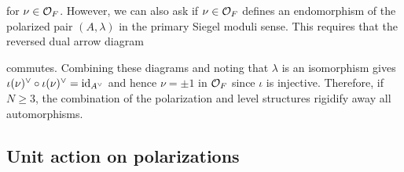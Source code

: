 \documentclass[main.tex]{subfiles}
\begin{document}
\begin{rmk}
\begin{center}
\end{center}
for $\nu \in \mathcal{O}_F$. However, we can also ask if $\nu \in \mathcal{O}_F$ defines an endomorphism of the polarized pair $(A, \lambda)$ in the primary Siegel moduli sense. This requires that the reversed dual arrow diagram 
\begin{center}
\end{center}
commutes. Combining these diagrams and noting that $\lambda$ is an isomorphism gives $\iota(\nu)^{\vee} \circ \iota(\nu)^{\vee} = \mathrm{id}_{A^{\vee}}$ and hence $\nu = \pm 1$ in $\mathcal{O}_F$ since $\iota$ is injective. Therefore, if $N \ge 3$, the combination of the polarization and level structures rigidify away all automorphisms. 
\end{rmk}

\subsection{Unit action on polarizations}
\end{document}

